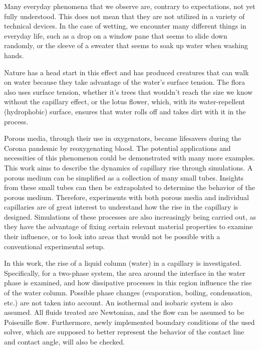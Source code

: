 Many everyday phenomena that we observe are, contrary to expectations, not yet fully understood. This does not mean that they are not utilized in a variety of technical devices. In the case of wetting, we encounter many different things in everyday life, such as a drop on a window pane that seems to slide down randomly, or the sleeve of a sweater that seems to soak up water when washing hands.

Nature has a head start in this effect and has produced creatures that can walk on water because they take advantage of the water's surface tension. The flora also uses surface tension, whether it's trees that wouldn't reach the size we know without the capillary effect, or the lotus flower, which, with its water-repellent (hydrophobic) surface, ensures that water rolls off and takes dirt with it in the process.

Porous media, through their use in oxygenators, became lifesavers during the Corona pandemic by reoxygenating blood. The potential applications and necessities of this phenomenon could be demonstrated with many more examples. This work aims to describe the dynamics of capillary rise through simulations. A porous medium can be simplified as a collection of many small tubes. Insights from these small tubes can then be extrapolated to determine the behavior of the porous medium. Therefore, experiments with both porous media and individual capillaries are of great interest to understand how the rise in the capillary is designed. Simulations of these processes are also increasingly being carried out, as they have the advantage of fixing certain relevant material properties to examine their influence, or to look into areas that would not be possible with a conventional experimental setup.

In this work, the rise of a liquid column (water) in a capillary is investigated. Specifically, for a two-phase system, the area around the interface in the water phase is examined, and how dissipative processes in this region influence the rise of the water column. Possible phase changes (evaporation, boiling, condensation, etc.) are not taken into account. An isothermal and isobaric system is also assumed. All fluids treated are Newtonian, and the flow can be assumed to be Poiseuille flow. Furthermore, newly implemented boundary conditions of the used solver, which are supposed to better represent the behavior of the contact line and contact angle, will also be checked. 

